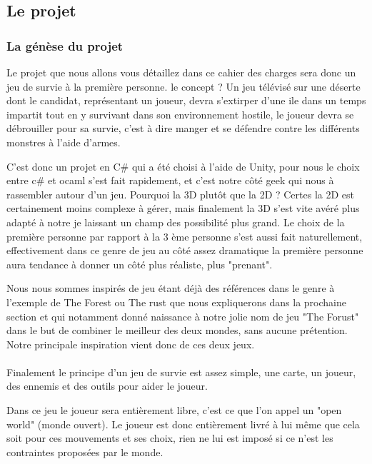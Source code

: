 \documentclass{article}
\begin{document}
\newpage
\subsection{Le projet}
\subsubsection{La génèse du projet}


\par
Le projet que nous allons vous détaillez dans ce cahier des charges sera donc un jeu de survie à la première personne. le concept ? Un jeu télévisé sur une déserte dont le candidat, représentant un joueur, devra s'extirper d'une ile dans un temps impartit tout en y survivant dans son environnement hostile, le joueur devra se débrouiller pour sa survie, c'est à dire manger et se défendre contre les différents monstres à l'aide d'armes.
\newline

\par
C'est donc un projet en C\# qui a été choisi à l'aide de Unity, pour nous le choix entre c# et ocaml s'est fait rapidement, et c'est notre côté geek qui nous à rassembler autour  d'un jeu. Pourquoi la 3D plutôt que la 2D ? Certes la 2D est certainement moins complexe à gérer, mais finalement la 3D s'est vite avéré plus adapté à notre je laissant un champ des possibilité plus grand. 
Le choix de la première personne par rapport à la 3 ème personne s'est aussi  fait naturellement, effectivement dans  ce genre de jeu au côté assez dramatique la première personne aura tendance à donner un côté plus réaliste, plus "prenant".
\newline

\par
Nous nous sommes inspirés de jeu étant déjà des références dans le genre à l'exemple de The Forest ou The rust que nous expliquerons dans la prochaine section et qui notamment donné naissance à notre jolie nom  de jeu  "The Forust" dans le but de combiner le meilleur des deux mondes, sans aucune prétention.
Notre principale inspiration vient donc de ces deux jeux.

\paragraph{}
Finalement le principe d'un jeu de survie est assez simple,  une carte, un joueur, des ennemis et des outils  pour aider le joueur. 

Dans ce jeu le joueur sera entièrement libre, c'est ce que  l'on appel un "open world" (monde ouvert). Le joueur  est donc entièrement  livré  à lui même que cela soit pour ces mouvements et   ses choix, rien ne lui est imposé si ce n'est les contraintes proposées par  le monde.
\newline
\end{document}
